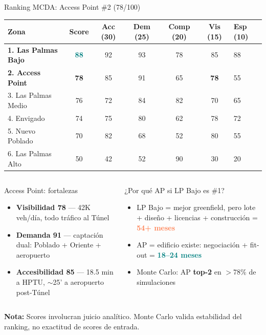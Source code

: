 \documentclass[aspectratio=169, 11pt]{beamer}
\newcommand{\highlight}[1]{\textcolor{teal}{\textbf{#1}}}
\newcommand{\danger}[1]{\textcolor{coral}{\textbf{#1}}}
\begin{document}
\begin{frame}{Ranking MCDA: Access Point \#2 (78/100)}
\vspace{-4pt}
{\scriptsize\setlength{\tabcolsep}{3.5pt}
\begin{tabular}{@{}lcccccl@{}}
\toprule
\textbf{Zona} & \textbf{Score} & \textbf{Acc (30)} & \textbf{Dem (25)} & \textbf{Comp (20)} & \textbf{Vis (15)} & \textbf{Esp (10)} \\
\midrule
\rowcolor{teal!12}
\textbf{1. Las Palmas Bajo} & \highlight{88} & 92 & 93 & 78 & 85 & 88 \\
\rowcolor{rose!10}
\textbf{2. Access Point} & \textcolor{rose}{\textbf{78}} & 85 & 91 & 65 & \textcolor{rose}{\textbf{78}} & 55 \\
3. Las Palmas Medio & 76 & 72 & 84 & 82 & 70 & 65 \\
4. Envigado & 74 & 75 & 80 & 62 & 78 & 72 \\
5. Nuevo Poblado & 70 & 82 & 68 & 52 & 80 & 55 \\
\rowcolor{coral!8}
6. Las Palmas Alto & 50 & 42 & 52 & 90 & 30 & 20 \\
\bottomrule
\end{tabular}
}

\vspace{3pt}
\begin{columns}[T]
\begin{exampleblock}{\small Access Point: fortalezas}
\scriptsize
\begin{itemize}\setlength{\itemsep}{0pt}
  \item \textcolor{rose}{\textbf{Visibilidad 78}} --- 42K veh/día, todo tráfico al Túnel
  \item \textbf{Demanda 91} --- captación dual: Poblado + Oriente + aeropuerto
  \item \textbf{Accesibilidad 85} --- 18.5 min a HPTU, $\sim$25' a aeropuerto post-Túnel
\end{itemize}
\end{exampleblock}

\begin{alertblock}{\small ¿Por qué AP si LP Bajo es \#1?}
\scriptsize
\begin{itemize}\setlength{\itemsep}{0pt}
  \item LP Bajo = mejor greenfield, pero lote + diseño + licencias + construcción = \danger{54+ meses}
  \item AP = edificio existe: negociación + fit-out = \highlight{18--24 meses}
  \item Monte Carlo: AP \textbf{top-2} en $>$78\% de simulaciones
\end{itemize}
\end{alertblock}
\end{columns}
\vspace{1pt}
{\tiny\textcolor{slate}{\textbf{Nota:}} Scores involucran juicio analítico. Monte Carlo valida estabilidad del ranking, no exactitud de scores de entrada.}
\end{frame}
\end{document}

